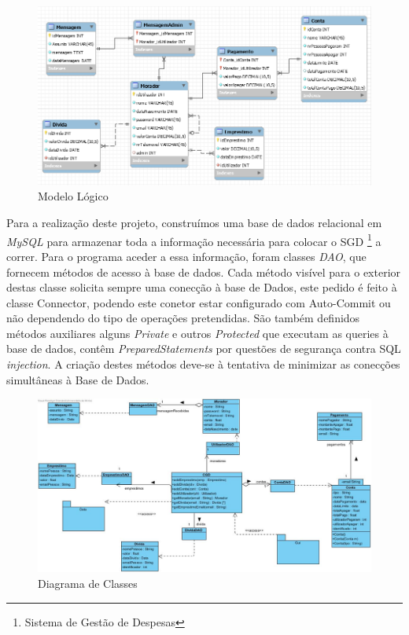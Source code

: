 \begin{figure}[htb!]
	\includegraphics[scale=0.6]{imagens/bd/modelologico}  
	\caption{Modelo Lógico}  
\end{figure}

Para a realização deste projeto, construímos uma base de dados relacional em \textit{MySQL} para armazenar toda a informação necessária para colocar o SGD \footnote{Sistema de Gestão de Despesas} a correr. Para o programa aceder a essa informação, foram classes \textit{DAO}, que fornecem métodos de acesso à base de dados. Cada método visível para o exterior
destas classe solicita sempre uma conecção à base de Dados, este pedido é feito à classe Connector, podendo este conetor estar configurado com Auto-Commit ou não dependendo do tipo de operações pretendidas.
São também definidos métodos auxiliares alguns \textit{Private} e outros \textit{Protected} que executam as queries à base de dados, contêm \textit{PreparedStatements} por questões de segurança contra SQL \textit{injection}. A criação destes métodos deve-se à tentativa de minimizar as conecções simultâneas à Base de Dados.

\begin{figure}[htb!]
	\centering
	\includegraphics[scale=0.47]{imagens/diagramaClasses/DiagramaClasseDAO}  
	\caption{Diagrama de Classes }  
\end{figure}


